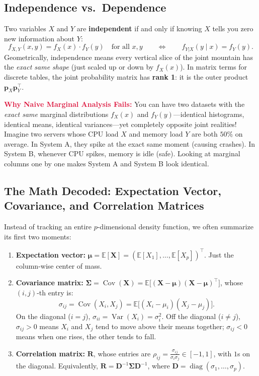 \documentclass[11pt, a4paper]{article}
\begin{document}
\subsection{Independence vs.\ Dependence}
Two variables $X$ and $Y$ are \textbf{independent} if and only if knowing $X$ tells you zero new information about $Y$:
\[
    f_{X,Y}(x, y) = f_X(x) \cdot f_Y(y) \quad \text{for all } x, y
    \qquad \Longleftrightarrow \qquad
    f_{Y|X}(y \mid x) = f_Y(y).
\]
Geometrically, independence means every vertical slice of the joint mountain has the \emph{exact same shape} (just scaled up or down by $f_X(x)$). In matrix terms for discrete tables, the joint probability matrix has \textbf{rank 1}: it is the outer product $\mathbf{p}_X \mathbf{p}_Y^\top$.

\textcolor{crimson}{\textbf{Why Naive Marginal Analysis Fails:}} You can have two datasets with the \emph{exact same} marginal distributions $f_X(x)$ and $f_Y(y)$---identical histograms, identical means, identical variances---yet completely opposite joint realities! Imagine two servers whose CPU load $X$ and memory load $Y$ are both $50\%$ on average. In System A, they spike at the exact same moment (causing crashes). In System B, whenever CPU spikes, memory is idle (safe). Looking at marginal columns one by one makes System A and System B look identical.

\subsection{The Math Decoded: Expectation Vector, Covariance, and Correlation Matrices}
Instead of tracking an entire $p$-dimensional density function, we often summarize its first two moments:
\begin{enumerate}
    \item \textbf{Expectation vector:} $\boldsymbol{\mu} = \mathbb{E}[\mathbf{X}] = (\mathbb{E}[X_1], \dots, \mathbb{E}[X_p])^\top$. Just the column-wise center of mass.
    \item \textbf{Covariance matrix:} $\boldsymbol{\Sigma} = \operatorname{Cov}(\mathbf{X}) = \mathbb{E}\big[(\mathbf{X} - \boldsymbol{\mu})(\mathbf{X} - \boldsymbol{\mu})^\top\big]$, whose $(i,j)$-th entry is:
    \[
        \sigma_{ij} = \operatorname{Cov}(X_i, X_j) = \mathbb{E}\big[(X_i - \mu_i)(X_j - \mu_j)\big].
    \]
    On the diagonal ($i=j$), $\sigma_{ii} = \operatorname{Var}(X_i) = \sigma_i^2$. Off the diagonal ($i \neq j$), $\sigma_{ij} > 0$ means $X_i$ and $X_j$ tend to move above their means together; $\sigma_{ij} < 0$ means when one rises, the other tends to fall.
    \item \textbf{Correlation matrix:} $\mathbf{R}$, whose entries are $\rho_{ij} = \frac{\sigma_{ij}}{\sigma_i \sigma_j} \in [-1, 1]$, with $1$s on the diagonal. Equivalently, $\mathbf{R} = \mathbf{D}^{-1}\boldsymbol{\Sigma}\mathbf{D}^{-1}$, where $\mathbf{D} = \operatorname{diag}(\sigma_1, \dots, \sigma_p)$.
\end{enumerate}
\end{document}
